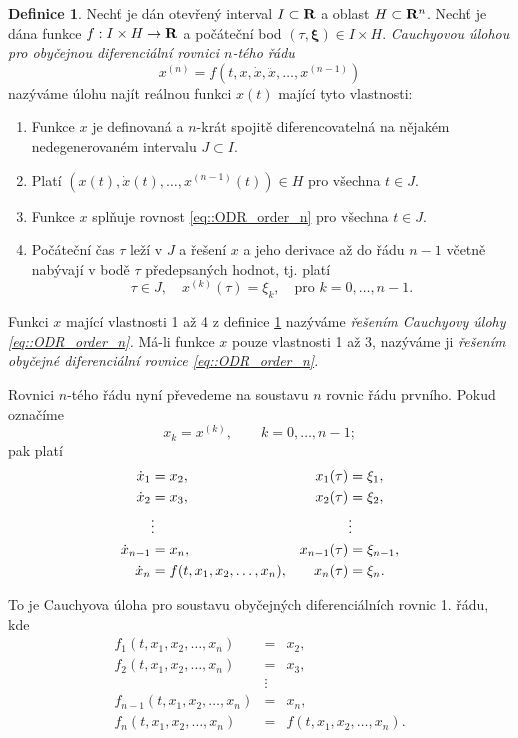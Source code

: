 \documentclass[a4paper, 12pt]{book}
\theoremstyle{definition}
\newtheorem{definition}[theorem]{Definice}
\def\to{\rightarrow}
\def\Real{{\rm\bf R}}
\def\vc#1{\mathbf{\boldsymbol{#1}}}     %
\begin{document}
\begin{definition}
\label{def::rovnice_radu_n}
Nechť je dán otevřený interval $I\subset \Real$ a oblast $H\subset \Real^{n}$.  Nechť je dána funkce
$f:I\times H\to \Real$ a počáteční bod $(\tau, \vc \xi) \in I\times H$. \emph{Cauchyovou 
úlohou pro obyčejnou diferenciální rovnici $n$-tého řádu}
\begin{equation}
    \label{eq::ODR_order_n}
    x^{(n)} = f(t,x,\dot x, \ddot x,\dots,x^{(n-1)})
\end{equation}
nazýváme úlohu najít reálnou funkci $x(t)$ mající tyto vlastnosti:
\begin{enumerate}
\item Funkce $x$ je definovaná a $n$-krát spojitě diferencovatelná na nějakém
nedegenerovaném intervalu $J\subset I$.
\item Platí $(x(t),\dot x(t),\dots, x^{(n-1)}(t))\in H$ pro všechna $t\in J$.
\item Funkce $x$ splňuje rovnost \eqref{eq::ODR_order_n}
pro všechna $t\in J$.
\item Počáteční čas $\tau$ leží v $J$ a řešení $x$ a jeho derivace až do
řádu $n-1$ včetně nabývají v bodě $\tau$ předepsaných hodnot, tj. platí
\[
\tau\in J,\quad x^{(k)}(\tau)=\xi_k, \quad \text{pro } k=0,\dots, n-1.
\]
\end{enumerate}
\end{definition}

Funkci $x$ mající vlastnosti 1 až 4 z definice \ref{def::rovnice_radu_n} nazýváme 
\emph{řešením Cauchyovy úlohy \eqref{eq::ODR_order_n}.} Má-li funkce $x$ pouze vlastnosti
1 až 3, nazýváme ji \emph{řešením obyčejné diferenciální rovnice \eqref{eq::ODR_order_n}.}

Rovnici $n$-tého řádu nyní převedeme na soustavu $n$ rovnic řádu prvního. Pokud označíme
\[
    x_k = x^{(k)}, \qquad k=0,\dots,n-1;
\]
pak platí
\begin{align*}
\label{eq::soustava_n_rad} 
%
\dot x_1 &= x_2,& x_1(\tau)&=\xi_1, \\
\dot x_2 &= x_3,& x_2(\tau)&=\xi_2, \\
\notag
&\vdots &&\vdots \\
\dot x_{n-1} &= x_n,& x_{n-1}(\tau)&=\xi_{n-1}, \\
\dot x_n &= f(t,x_1,x_2,\dots,x_n),& x_n(\tau)&=\xi_n.
\end{align*}

To je Cauchyova úloha pro soustavu obyčejných diferenciálních rovnic 1. řádu, kde
\begin{eqnarray*}
f_1(t,x_1,x_2,\dots,x_n) &=& x_2, \\
f_2(t,x_1,x_2,\dots,x_n) &=& x_3, \\
&\vdots&\\
f_{n-1}(t,x_1,x_2,\dots,x_n) &=& x_n, \\
f_n(t,x_1,x_2,\dots,x_n) &=& f(t,x_1,x_2,\dots,x_n).
\end{eqnarray*}
\end{document}
